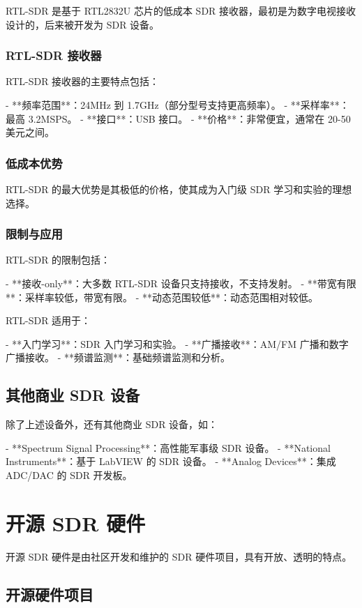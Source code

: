 \documentclass[UTF8]{ctexbook}
\begin{document}
RTL-SDR 是基于 RTL2832U 芯片的低成本 SDR 接收器，最初是为数字电视接收设计的，后来被开发为 SDR 设备。

\subsubsection{RTL-SDR 接收器}

RTL-SDR 接收器的主要特点包括：

- **频率范围**：24MHz 到 1.7GHz（部分型号支持更高频率）。
- **采样率**：最高 3.2MSPS。
- **接口**：USB 接口。
- **价格**：非常便宜，通常在 20-50 美元之间。

\subsubsection{低成本优势}

RTL-SDR 的最大优势是其极低的价格，使其成为入门级 SDR 学习和实验的理想选择。

\subsubsection{限制与应用}

RTL-SDR 的限制包括：

- **接收-only**：大多数 RTL-SDR 设备只支持接收，不支持发射。
- **带宽有限**：采样率较低，带宽有限。
- **动态范围较低**：动态范围相对较低。

RTL-SDR 适用于：

- **入门学习**：SDR 入门学习和实验。
- **广播接收**：AM/FM 广播和数字广播接收。
- **频谱监测**：基础频谱监测和分析。

\subsection{其他商业 SDR 设备}

除了上述设备外，还有其他商业 SDR 设备，如：

- **Spectrum Signal Processing**：高性能军事级 SDR 设备。
- **National Instruments**：基于 LabVIEW 的 SDR 设备。
- **Analog Devices**：集成 ADC/DAC 的 SDR 开发板。

\section{开源 SDR 硬件}

开源 SDR 硬件是由社区开发和维护的 SDR 硬件项目，具有开放、透明的特点。

\subsection{开源硬件项目}
\end{document}
